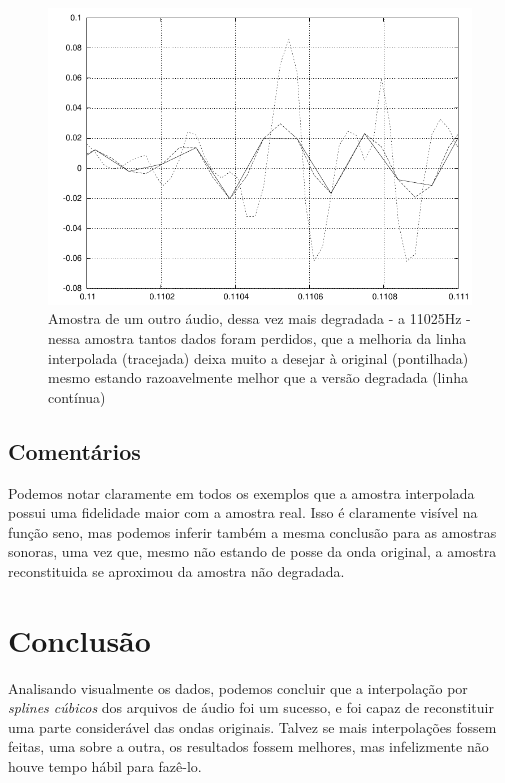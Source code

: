 \clearpage

\begin{figure}[h]
\begin{center}
\leavevmode
\includegraphics[scale=1]{../img/drum03-11025-comp.pdf} 
\caption{Amostra de um outro áudio, dessa vez mais degradada - a 11025Hz - nessa amostra tantos dados foram perdidos, que a melhoria da linha interpolada (tracejada) deixa muito a desejar à original (pontilhada) mesmo estando razoavelmente melhor que a versão degradada (linha contínua)}
\end{center}
\end{figure}

\subsection {Comentários}

Podemos notar claramente em todos os exemplos que a amostra interpolada possui uma fidelidade maior com a amostra real. Isso é claramente visível na função seno, mas podemos inferir também a mesma conclusão para as amostras sonoras, uma vez que, mesmo não estando de posse da onda original, a amostra reconstituida se aproximou da amostra não degradada.

\section{Conclusão}

Analisando visualmente os dados, podemos concluir que a interpolação por \textit{splines cúbicos} dos arquivos de áudio foi um sucesso, e foi capaz de reconstituir uma parte considerável das ondas originais. Talvez se mais interpolações fossem feitas, uma sobre a outra, os resultados fossem melhores, mas infelizmente não houve tempo hábil para fazê-lo.

